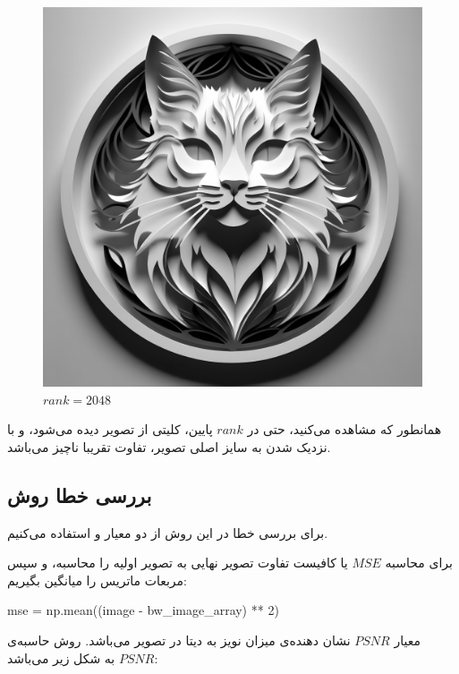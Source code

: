 \begin{figure}
  \includegraphics[width=\linewidth]{../image-compression/cat-2048.png}
  \caption{$rank=2048$}
  \label{fig:cat-bw-rank-2048}
\end{figure}

همانطور که مشاهده می‌کنید، حتی در $rank$
پایین، کلیتی از تصویر دیده می‌شود، و با نزدیک شدن به سایز اصلی تصویر، تفاوت تقریبا ناچیز می‌باشد.

\subsection{بررسی خطا روش}
برای بررسی خطا در این روش
از دو معیار
و
استفاده می‌کنیم.
\cite{4426357}
\cite{imcprichdavad}


برای محاسبه‌
$MSE$
یا
کافیست تفاوت تصویر نهایی به تصویر اولیه را محاسبه، و سپس مربعات ماتریس را میانگین بگیریم:

\begin{latin}
  \begin{python}
mse = np.mean((image - bw_image_array) ** 2)
  \end{python}
\end{latin}


معیار
$PSNR$
نشان دهنده‌ی میزان نویز به دیتا در تصویر می‌باشد.
روش حاسبه‌ی
$PSNR$
به شکل زیر می‌باشد:


